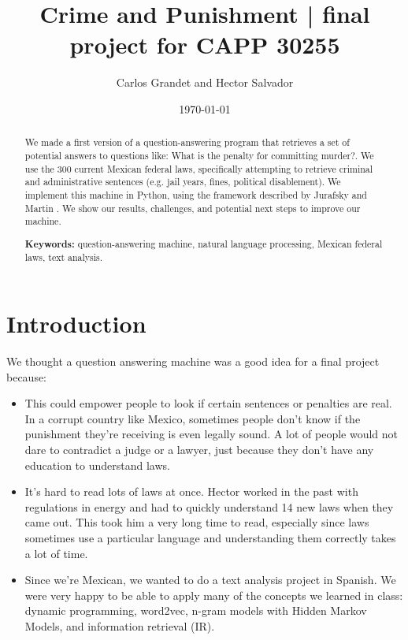 \documentclass[letterpaper]{article}
\title{Crime and Punishment | final project for CAPP 30255}
\author{Carlos Grandet and Hector Salvador}
\date{\today}
\begin{document}
\maketitle

\begin{abstract}
We made a first version of a question-answering program that retrieves a set of potential answers to questions like: What is the penalty for committing murder?. We use the 300 current Mexican federal laws, specifically attempting to retrieve criminal and administrative sentences (e.g. jail years, fines, political disablement). We implement this machine in Python, using the framework described by Jurafsky and Martin \cite{jurafsky}. We show our results, challenges, and potential next steps to improve our machine.
\linebreak

\textbf{Keywords:} question-answering machine, natural language processing, Mexican federal laws, text analysis.
\end{abstract}

\section{Introduction}
\label{sec:introduction}

We thought a question answering machine was a good idea for a final project because:
\begin{itemize}
\item This could empower people to look if certain sentences or penalties are real. In a corrupt country like Mexico, sometimes people don't know if the punishment they're receiving is even legally sound. A lot of people would not dare to contradict a judge or a lawyer, just because they don't have any education to understand laws. 
\item It's hard to read lots of laws at once. Hector worked in the past with regulations in energy and had to quickly understand 14 new laws when they came out. This took him a very long time to read, especially since laws sometimes use a particular language and understanding them correctly takes a lot of time.
\item Since we're Mexican, we wanted to do a text analysis project in Spanish. We were very happy to  be able to apply many of the concepts we learned in class: dynamic programming, word2vec, n-gram models with Hidden Markov Models, and information retrieval (IR).
\end{itemize}
\end{document}
